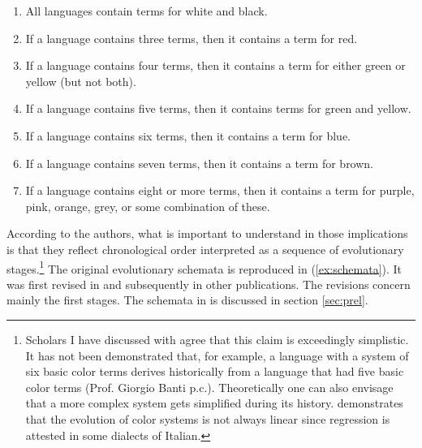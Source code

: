 
\begin{enumerate}\addtolength{\itemsep}{-0.5\baselineskip}
\item All languages contain terms for white and black.
 \item If a language contains three terms, then it contains a term for red.
\item If a language contains four terms, then it contains a term for either
green or yellow (but not both).
\item If a language contains five terms, then it contains terms for green and
yellow.
\item If a language contains six terms, then it contains a term for blue.
\item If a language contains seven terms, then it contains a term for brown.
\item If a language contains eight or more terms, then it contains a term for
purple, pink, orange, grey, or some combination of these.
\end{enumerate}



According to the authors, what is important to understand in those implications
is that they reflect chronological order interpreted as a sequence of
evolutionary stages.\footnote{Scholars I have discussed with agree that this
claim is exceedingly simplistic. It has not been demonstrated that, for example,
a language with a system of six basic color terms derives historically from a
language that had five basic color terms (Prof. Giorgio Banti p.c.).
Theoretically one can also envisage that a more complex system gets simplified
during its history. \cite{Kris80} demonstrates that the evolution of color
systems is not always linear since regression is attested in some dialects of
Italian.} The  original evolutionary schemata \cite[4]{Berl69}  is reproduced in
(\ref{ex:schemata}). It was first revised in \citet[260-261]{Kay75} and
subsequently in other publications. The revisions concern mainly the first
stages. The schemata in \cite{Kay97} is discussed in section \ref{sec:prel}.


